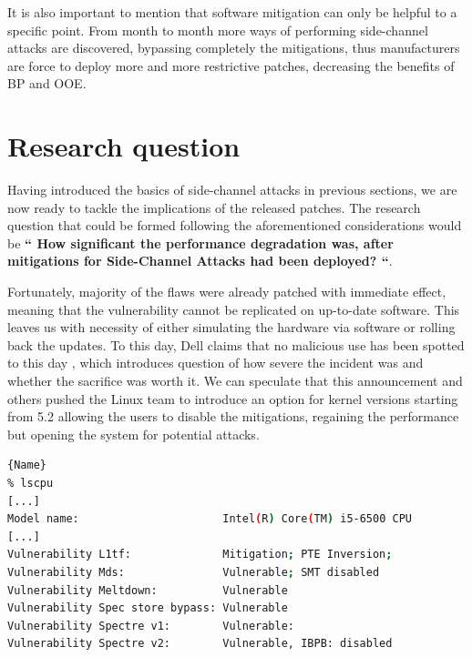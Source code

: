 \documentclass{csfourzero}
\begin{document}
It is also important to mention that software mitigation can only be helpful to a specific point. From month to month more ways of performing side-channel attacks are discovered, bypassing completely the mitigations, thus manufacturers are force to deploy more and more restrictive patches, decreasing the benefits of BP and OOE.


\section{Research question}
\label{sec:rq}
Having introduced the basics of side-channel attacks in previous sections, we are now ready to tackle the implications of the released patches. The research question that could be formed following the aforementioned considerations would be \textbf{`` How significant the performance degradation was, after mitigations for Side-Channel Attacks had been deployed? ``}. 

Fortunately, majority of the flaws were already patched with immediate effect, meaning that the vulnerability cannot be replicated on up-to-date software. This leaves us with necessity of either simulating the hardware via software or rolling back the updates. To this day, Dell claims that no malicious use has been spotted to this day \cite{dell}, which introduces question of how severe the incident was and whether the sacrifice was worth it. We can speculate that this announcement and others pushed the Linux team to introduce an option for kernel versions starting from 5.2 allowing the users to disable the mitigations, regaining the performance but opening the system for potential attacks.  

\begin{lstlisting}[caption=Vulnerable Linux system with disabled mitigations,frame=tlrb,language=bash]{Name}
% lscpu            
[...]
Model name:                      Intel(R) Core(TM) i5-6500 CPU 
[...]
Vulnerability L1tf:              Mitigation; PTE Inversion;
Vulnerability Mds:               Vulnerable; SMT disabled
Vulnerability Meltdown:          Vulnerable
Vulnerability Spec store bypass: Vulnerable
Vulnerability Spectre v1:        Vulnerable:
Vulnerability Spectre v2:        Vulnerable, IBPB: disabled
\end{lstlisting}
\end{document}
